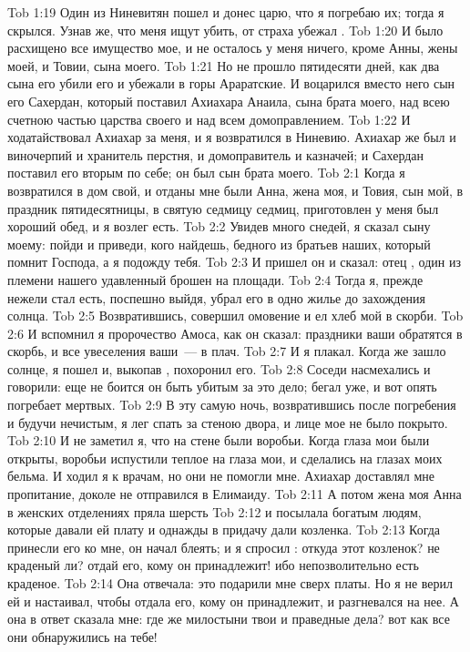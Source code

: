 \vs Tob 1:19 Один из Ниневитян пошел и донес царю, что я погребаю их; тогда я скрылся. Узнав же, что меня ищут убить, от страха убежал .
\vs Tob 1:20 И было расхищено все имущество мое, и не осталось у меня ничего, кроме Анны, жены моей, и Товии, сына моего.
\vs Tob 1:21 Но не прошло пятидесяти дней, как два сына его убили его и убежали в горы Араратские. И воцарился вместо него сын его Сахердан, который поставил Ахиахара Анаила, сына брата моего, над всею счетною частью царства своего и над всем домоправлением.
\vs Tob 1:22 И ходатайствовал Ахиахар за меня, и я возвратился в Ниневию. Ахиахар же был и виночерпий и хранитель перстня, и домоправитель и казначей; и Сахердан поставил его вторым по себе; он был сын брата моего.
\vs Tob 2:1 Когда я возвратился в дом свой, и отданы мне были Анна, жена моя, и Товия, сын мой, в праздник пятидесятницы, в святую седмицу седмиц, приготовлен у меня был хороший обед, и я возлег есть.
\vs Tob 2:2 Увидев много снедей, я сказал сыну моему: пойди и приведи, кого найдешь, бедного из братьев наших, который помнит Господа, а я подожду тебя.
\vs Tob 2:3 И пришел он и сказал: отец , один из племени нашего удавленный брошен на площади.
\vs Tob 2:4 Тогда я, прежде нежели стал есть, поспешно выйдя, убрал его в одно жилье до захождения солнца.
\vs Tob 2:5 Возвратившись, совершил омовение и ел хлеб мой в скорби.
\vs Tob 2:6 И вспомнил я пророчество Амоса, как он сказал: праздники ваши обратятся в скорбь, и все увеселения ваши~--- в плач.
\vs Tob 2:7 И я плакал. Когда же зашло солнце, я пошел и, выкопав , похоронил его.
\vs Tob 2:8 Соседи насмехались  и говорили: еще не боится он быть убитым за это дело; бегал уже, и вот опять погребает мертвых.
\vs Tob 2:9 В эту самую ночь, возвратившись после погребения и будучи нечистым, я лег спать за стеною двора, и лице мое не было покрыто.
\vs Tob 2:10 И не заметил я, что на стене были воробьи. Когда глаза мои были открыты, воробьи испустили теплое на глаза мои, и сделались на глазах моих бельма. И ходил я к врачам, но они не помогли мне. Ахиахар доставлял мне пропитание, доколе не отправился в Елимаиду.
\vs Tob 2:11 А потом жена моя Анна в женских отделениях пряла шерсть
\vs Tob 2:12 и посылала богатым людям, которые давали ей плату и однажды в придачу дали козленка.
\vs Tob 2:13 Когда принесли его ко мне, он начал блеять; и я спросил : откуда этот козленок? не краденый ли? отдай его, кому он принадлежит! ибо непозволительно есть краденое.
\vs Tob 2:14 Она отвечала: это подарили мне сверх платы. Но я не верил ей и настаивал, чтобы отдала его, кому он принадлежит, и разгневался на нее. А она в ответ сказала мне: где же милостыни твои и праведные дела? вот как все они обнаружились на тебе!

